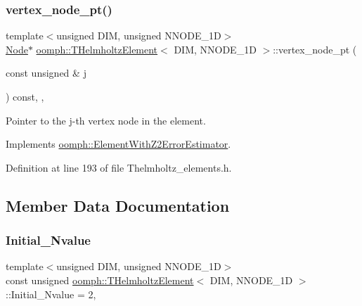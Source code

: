 \mbox{\label{classoomph_1_1THelmholtzElement_a197a8b32a158615fcbfa21b256584b66}} 
\subsubsection{\texorpdfstring{vertex\+\_\+node\+\_\+pt()}{vertex\_node\_pt()}}
{\footnotesize\ttfamily template$<$unsigned D\+IM, unsigned N\+N\+O\+D\+E\+\_\+1D$>$ \\
\hyperlink{classoomph_1_1Node}{Node}$\ast$ \hyperlink{classoomph_1_1THelmholtzElement}{oomph\+::\+T\+Helmholtz\+Element}$<$ D\+IM, N\+N\+O\+D\+E\+\_\+1D $>$\+::vertex\+\_\+node\+\_\+pt (\begin{DoxyParamCaption}\item[{const unsigned \&}]{j }\end{DoxyParamCaption}) const\hspace{0.3cm}{\ttfamily [inline]}, {\ttfamily [protected]}, {\ttfamily [virtual]}}



Pointer to the j-\/th vertex node in the element. 



Implements \hyperlink{classoomph_1_1ElementWithZ2ErrorEstimator_a0eedccc33519f852c5dc2055ddf2774b}{oomph\+::\+Element\+With\+Z2\+Error\+Estimator}.



Definition at line 193 of file Thelmholtz\+\_\+elements.\+h.



\subsection{Member Data Documentation}
\mbox{\label{classoomph_1_1THelmholtzElement_a1ea1f4e0ec223fbdf200fc6fbcfd8cd0}} 
\subsubsection{\texorpdfstring{Initial\+\_\+\+Nvalue}{Initial\_Nvalue}}
{\footnotesize\ttfamily template$<$unsigned D\+IM, unsigned N\+N\+O\+D\+E\+\_\+1D$>$ \\
const unsigned \hyperlink{classoomph_1_1THelmholtzElement}{oomph\+::\+T\+Helmholtz\+Element}$<$ D\+IM, N\+N\+O\+D\+E\+\_\+1D $>$\+::Initial\+\_\+\+Nvalue = 2\hspace{0.3cm}{\ttfamily [static]}, {\ttfamily [private]}}



